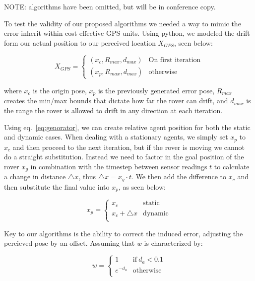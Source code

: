 NOTE: algorithms have been omitted, but will be in conference copy.

To test the validity of our proposed algorithms we needed a way to mimic the error inherit within cost-effective GPS units. Using python, we modeled the drift form our actual position to our perceived location $X_{GPS}$, seen below:

\begin{equation}
	X_{GPS} = 
	\begin{cases}
	(x_c, R_{max}, d_{max}) & \text{On first iteration} \\
	(x_p, R_{max}, d_{max}) & \text{otherwise}
	\end{cases}
	\label{eq:genorator}
\end{equation}

where $x_c$ is the origin pose, $x_p$ is the previously generated error pose, $R_{max}$ creates the min/max bounds that dictate how far the rover can drift, and $d_{max}$ is the range the rover is allowed to drift in any direction at each iteration. 

Using eq.~\ref{eq:genorator}, we can create relative agent position for both the static and dynamic cases. When dealing with a stationary agents, we simply set $x_p$ to $x_c$ and then proceed to the next iteration, but if the rover is moving we cannot do a straight substitution. Instead we need to factor in the goal position of the rover $x_g$ in combination with the timestep between sensor readings $t$ to calculate a change in distance $\triangle x$, thus $\triangle x = x_g \cdot t$. We then add the difference to $x_c$ and then substitute the final value into $x_p$, as seen below:

\begin{equation}
x_p = 
	\begin{cases}
		x_c & \text{static} \\
		x_c + \triangle x & \text{dynamic}\\
	\end{cases}
	\label{eq:genorator_expln}
\end{equation}

Key to our algorithms is the ability to correct the induced error, adjusting the percieved pose by an offset. Assuming that $w$ is characterized by:

\[
w = 
\begin{cases}
	1 & \text{if}~d_a < 0.1 \\
	e^{-d_a} & \text{otherwise} \\
\end{cases}
\]

